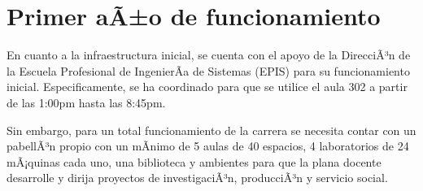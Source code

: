 \section{Primer aÃ±o de funcionamiento}

En cuanto a la infraestructura inicial, se cuenta con el apoyo de la DirecciÃ³n de la Escuela Profesional de IngenierÃ­a de Sistemas (EPIS) para su funcionamiento inicial. Especificamente, se ha coordinado para que se utilice el aula 302 a partir de las 1:00pm hasta las 8:45pm.

Sin embargo, para un total funcionamiento de la carrera se necesita contar con un pabellÃ³n propio con un mÃ­nimo de 5 aulas de 40 espacios, 4 laboratorios de 24 mÃ¡quinas cada uno, una biblioteca y ambientes para que la plana docente desarrolle y dirija proyectos de investigaciÃ³n, producciÃ³n y servicio social.

